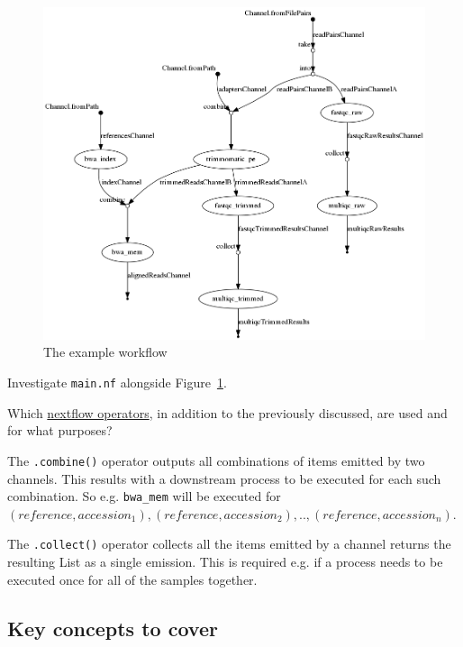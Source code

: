 \begin{figure}[H]
\centering
\includegraphics[width=\textwidth]{handout/flowchart.png}
\caption{The example workflow}
\label{fig:dag}
\end{figure}


\begin{questions}
Investigate \texttt{main.nf} alongside Figure~\ref{fig:dag}. 

Which \href{https://www.nextflow.io/docs/latest/operator.html}{nextflow operators}, in addition to the previously discussed, are used and for what purposes? 

\begin{answer}
The \texttt{.combine()} operator outputs all combinations of items emitted by two channels. This results with a downstream process to be executed for each such combination. So e.g. \texttt{bwa\_mem} will be executed for\\ $(reference, accession_1),(reference, accession_2),..,(reference, accession_n)$.

The \texttt{.collect()} operator collects all the items emitted by a channel returns the resulting List as a single emission. This is required e.g. if a process needs to be executed once for all of the samples together.  
\end{answer}

\end{questions}

\subsection{Key concepts to cover}

